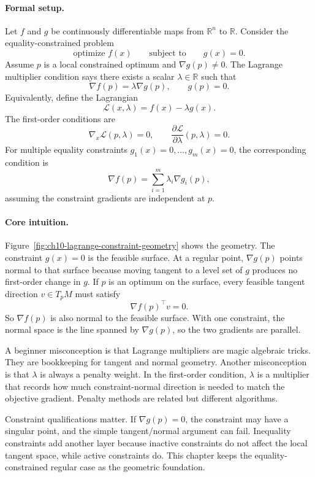 \paragraph{Formal setup.}
Let \(f\) and \(g\) be continuously differentiable maps from \(\mathbb{R}^n\) to \(\mathbb{R}\). Consider the equality-constrained problem
\[
\text{optimize } f(x)
\qquad
\text{subject to}\qquad
g(x)=0.
\]
Assume \(p\) is a local constrained optimum and \(\nabla g(p)\neq0\). The Lagrange multiplier condition says there exists a scalar \(\lambda\in\mathbb{R}\) such that
\[
\nabla f(p)=\lambda \nabla g(p),
\qquad
g(p)=0.
\]
Equivalently, define the Lagrangian
\[
\mathcal{L}(x,\lambda)=f(x)-\lambda g(x).
\]
The first-order conditions are
\[
\nabla_x\mathcal{L}(p,\lambda)=0,
\qquad
\frac{\partial \mathcal{L}}{\partial \lambda}(p,\lambda)=0.
\]
For multiple equality constraints \(g_1(x)=0,\ldots,g_m(x)=0\), the corresponding condition is
\[
\nabla f(p)=\sum_{i=1}^m \lambda_i \nabla g_i(p),
\]
assuming the constraint gradients are independent at \(p\).

\paragraph{Core intuition.}
Figure~\ref{fig:ch10-lagrange-constraint-geometry} shows the geometry. The constraint \(g(x)=0\) is the feasible surface. At a regular point, \(\nabla g(p)\) points normal to that surface because moving tangent to a level set of \(g\) produces no first-order change in \(g\). If \(p\) is an optimum on the surface, every feasible tangent direction \(v\in T_pM\) must satisfy
\[
\nabla f(p)^\top v=0.
\]
So \(\nabla f(p)\) is also normal to the feasible surface. With one constraint, the normal space is the line spanned by \(\nabla g(p)\), so the two gradients are parallel.

A beginner misconception is that Lagrange multipliers are magic algebraic tricks. They are bookkeeping for tangent and normal geometry. Another misconception is that \(\lambda\) is always a penalty weight. In the first-order condition, \(\lambda\) is a multiplier that records how much constraint-normal direction is needed to match the objective gradient. Penalty methods are related but different algorithms.

Constraint qualifications matter. If \(\nabla g(p)=0\), the constraint may have a singular point, and the simple tangent/normal argument can fail. Inequality constraints add another layer because inactive constraints do not affect the local tangent space, while active constraints do. This chapter keeps the equality-constrained regular case as the geometric foundation.


